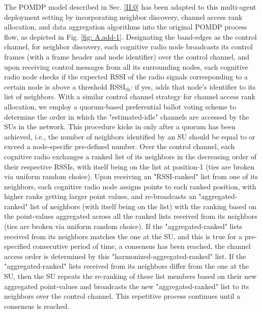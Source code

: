 \documentclass[12pt, draftcls, onecolumn]{IEEEtran}
\begin{document}
The POMDP model described in Sec. \ref{II.0} has been adapted to this multi-agent deployment setting by incorporating neighbor discovery, channel access rank allocation, and data aggregation algorithms into the original POMDP process flow, as depicted in Fig. \ref{fig: A.add-1}. Designating the band-edges as the control channel, for neighbor discovery, each cognitive radio node broadcasts its control frames (with a frame header and node identifier) over the control channel, and upon receiving control messages from all its surrounding nodes, each cognitive radio node checks if the expected RSSI of the radio signals corresponding to a certain node is above a threshold $\text{RSSI}_\text{th}$: if yes, adds that node’s identifier to its list of neighbors. With a similar control channel strategy for channel access rank allocation, we employ a quorum-based preferential ballot voting scheme to determine the order in which the "estimated-idle" channels are accessed by the SUs in the network. This procedure kicks in only after a quorum has been achieved, i.e., the number of neighbors identified by an SU should be equal to or exceed a node-specific pre-defined number. Over the control channel, each cognitive radio exchanges a ranked list of its neighbors in the decreasing order of their respective  RSSIs, with itself being on the list at position-1 (ties are broken via uniform random choice). Upon receiving an "RSSI-ranked" list from one of its neighbors, each cognitive radio node assigns points to each ranked position, with higher ranks getting larger point values, and re-broadcasts an "aggregated-ranked" list of neighbors (with itself being on the list) with the ranking based on the point-values aggregated across all the ranked lists received from its neighbors (ties are broken via uniform random choice). If the "aggregated-ranked" lists received from its neighbors matches the one at the SU, and this is true for a pre-specified consecutive period of time, a consensus has been reached, the channel access order is determined by this "harmonized-aggregated-ranked" list. If the "aggregated-ranked" lists received from its neighbors differ from the one at the SU, then  the SU repeats the re-ranking of these list members based on their new aggregated point-values and broadcasts the new "aggregated-ranked" list to its neighbors over the control channel. This repetitive process continues until a consensus is reached.
\end{document}
